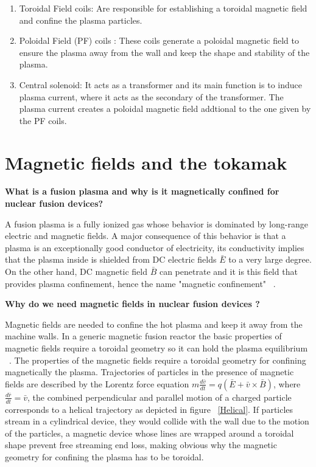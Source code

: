 \begin{enumerate}
	\item Toroidal Field coils: Are responsible for establishing a toroidal magnetic field  and confine the plasma particles.
	\smallskip
	
	\item Poloidal Field (PF) coils : These coils generate a poloidal magnetic field  to ensure the plasma away from the wall and keep the shape and stability of the plasma.\smallskip
	
	\item Central solenoid: It acts as a transformer and its main function is to induce plasma current, where it acts as the secondary of the transformer. The plasma current creates a poloidal magnetic field addtional to the one given by the PF coils. \smallskip
	
\end{enumerate}



\section{Magnetic fields and the tokamak}

\textbf{What is a fusion plasma and why is it magnetically confined for nuclear fusion devices?}

A fusion plasma is a fully ionized gas whose behavior is dominated by long-range electric and magnetic fields. A major consequence of this behavior is that a plasma is an exceptionally good conductor of electricity, its conductivity implies that the plasma inside is shielded from DC electric fields $\bar{E}$ to a very large degree. On the other hand, DC magnetic field $\bar{B}$ can penetrate and it is this field that provides plasma confinement, hence the name "magnetic confinement" ~\cite[Chapter~6]{Freidberg2007}.\smallskip

\textbf{Why do we need magnetic fields in nuclear fusion devices ?}
\smallskip

Magnetic fields are needed to confine the hot plasma and keep it away from the machine walls.  In a generic magnetic fusion reactor the basic properties of magnetic fields require  a toroidal geometry so it can hold the plasma equilibrium ~\cite[Chapter~4]{Freidberg2007}. The properties of the magnetic fields require a toroidal geometry for confining magnetically the plasma. Trajectories of particles in the presence of magnetic fields are described by the Lorentz force equation $m \frac{d\bar{v}}{dt}=q(\bar{E}+\bar{v}\times \bar{B})$, where $\frac{d\bar{r}}{dt}=\bar{v}$, the combined perpendicular and parallel motion of a charged particle corresponds to a helical trajectory as  depicted in figure ~\ref{Helical}. If particles stream in a cylindrical device, they would collide with the wall due to the motion of the particles, a magnetic device whose lines are wrapped around  a toroidal shape  prevent free streaming end loss, making obvious why the magnetic geometry for confining the plasma has to be toroidal.\smallskip

